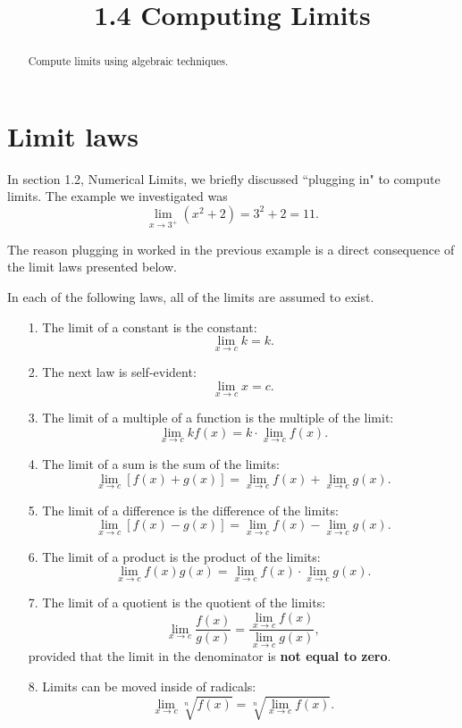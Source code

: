 \documentclass{ximera}
\title{1.4 Computing Limits}
\begin{document}
\begin{abstract}
Compute limits using algebraic techniques.
\end{abstract}

\maketitle


\section{Limit laws}
 
In section 1.2, Numerical Limits, we briefly discussed ``plugging in" to compute limits.
 The example we investigated was
 \[
 \lim_{x \to 3^+} \left(x^2 + 2 \right) = 3^2 + 2 = 11.
 \]

The reason plugging in worked in the previous example is a direct consequence of the limit laws presented below.
 
In each of the following laws, all of the limits are assumed to exist.

\begin{enumerate}

\item[1.]  
The limit of a constant is the constant:
 \[
 \lim_{x \to c} k = k.
 \]
 
\item[2.]
 The next law is self-evident:
 \[
 \lim_{x \to c} x = c.
 \]
 
 \item[3.]
 The limit of a multiple of a function is the multiple of the limit:
 \[
 \lim_{x \to c} kf(x) = k \cdot \lim_{x \to c} f(x). 
 \]
 
 \item[4.]
 The limit of a sum is the sum of the limits:
 \[
 \lim_{x \to c} \left[f(x) + g(x) \right] = \lim_{x \to c} f(x) + \lim_{x \to c} g(x). 
 \]
 
\item[5.]
 The limit of a difference is the difference of the limits:
 \[
 \lim_{x \to c} \left[f(x) - g(x) \right] = \lim_{x \to c} f(x) - \lim_{x \to c} g(x). 
 \]
 
\item[6.]
 The limit of a product is the product of the limits:
 \[
 \lim_{x \to c} f(x) g(x) = \lim_{x \to c} f(x) \cdot \lim_{x \to c} g(x). 
 \]


\item[7.]
 The limit of a quotient is the quotient of the limits:
 \[
 \lim_{x \to c} \frac{f(x)}{g(x)} = \frac{\lim_{x \to c} f(x)}{\lim_{x \to c} g(x)}, 
 \]
 provided that the limit in the denominator is \textbf{not equal to zero}.
 
 \item[8.]
 Limits can be moved inside of radicals:
 \[
 \lim_{x \to c} \sqrt[n]{f(x)} = \sqrt[n]{\lim_{x \to c} f(x)}. 
 \]

\end{enumerate}
\end{document}
